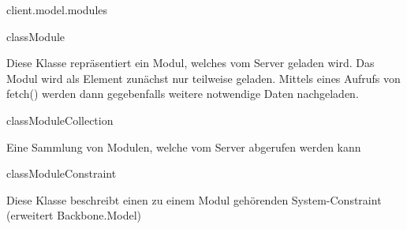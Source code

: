 \begin{texdocpackage}{client.model.modules}
\label{texdoclet:edu.kit.informatik.studyplan.client.model.modules}

\begin{texdocclass}{class}{Module}
\label{texdoclet:edu.kit.informatik.studyplan.client.model.modules.Module}
\begin{texdocclassintro}
Diese Klasse repräsentiert ein Modul, welches vom Server geladen wird. Das
 Modul wird als Element zunächst nur teilweise geladen. Mittels eines Aufrufs
 von fetch() werden dann gegebenfalls weitere notwendige Daten nachgeladen.\end{texdocclassintro}
\begin{texdocclassconstructors}
\end{texdocclassconstructors}
\end{texdocclass}


\begin{texdocclass}{class}{ModuleCollection}
\label{texdoclet:edu.kit.informatik.studyplan.client.model.modules.ModuleCollection}
\begin{texdocclassintro}
Eine Sammlung von Modulen, welche vom Server abgerufen werden kann\end{texdocclassintro}
\begin{texdocclassconstructors}
\end{texdocclassconstructors}
\begin{texdocclassmethods}
\end{texdocclassmethods}
\end{texdocclass}


\begin{texdocclass}{class}{ModuleConstraint}
\label{texdoclet:edu.kit.informatik.studyplan.client.model.modules.ModuleConstraint}
\begin{texdocclassintro}
Diese Klasse beschreibt einen zu einem Modul gehörenden System-Constraint
 (erweitert Backbone.Model)\end{texdocclassintro}
\begin{texdocclassconstructors}
\end{texdocclassconstructors}
\end{texdocclass}



\end{texdocpackage}
